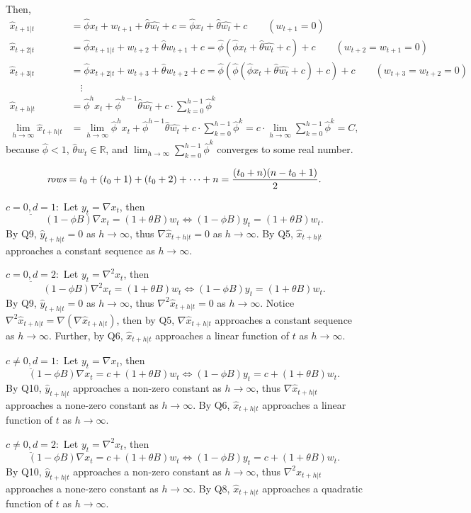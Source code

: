 \documentclass{article}
\begin{document}
Then, 
\begin{align*}
    \hat{x}_{t+1|t} & = \hat{\phi}x_t + w_{t+1} + \hat{\theta}\hat{w_t} + c = 
    \hat{\phi}x_t + \hat{\theta}\hat{w_t} + c \qquad (w_{t+1} = 0) \\
    \hat{x}_{t+2|t} & = \hat{\phi}x_{t+1|t} + w_{t+2} + \hat{\theta}w_{t+1} + c =
    \hat{\phi}\left(\hat{\phi}x_t + \hat{\theta}\hat{w_t}+c\right)+c \qquad (w_{t+2} =w_{t+1} = 0) \\
    \hat{x}_{t+3|t} & = \hat{\phi}x_{t+2|t} + w_{t+3} + \hat{\theta}w_{t+2}+c =
    \hat{\phi}\left(\hat{\phi}\left(\hat{\phi}x_t + \hat{\theta}\hat{w_t}+c\right)+c\right)+c \qquad (w_{t+3} =w_{t+2} = 0) \\
    &\quad \vdots \\
    \hat{x}_{t+h|t} & = \hat{\phi}^hx_t + \hat{\phi}^{h-1}\hat{\theta}\hat{w_t}+ c\cdot\sum_{k=0}^{h-1}\hat{\phi}^k \\
    \lim_{h\to\infty}\hat{x}_{t+h|t} & = \lim_{h\to\infty}\hat{\phi}^hx_t + \hat{\phi}^{h-1}\hat{\theta}\hat{w_t}+ c\cdot\sum_{k=0}^{h-1}\hat{\phi}^k =
    c\cdot\lim_{h\to\infty}\sum_{k=0}^{h-1}\hat{\phi}^k = C,
\end{align*}
because $\hat{\phi} < 1$, $\hat{\theta}w_t\in\mathbb{R}$, and 
$\lim_{h\to\infty}\sum_{k=0}^{h-1}\hat{\phi}^k$ converges to some real number.

$$\emph{rows} = t_0 + (t_0 + 1) + (t_0 + 2) + \cdots + n = \frac{(t_0 + n)(n-t_0+1)}{2}.$$

$\underline{c=0, d=1}:$
Let $y_t = \nabla x_t$, then 
$$(1-\phi B)\nabla x_t = (1+\theta B)w_t \Leftrightarrow (1-\phi B)y_t = (1+\theta B)w_t.$$
By Q9, $\hat{y}_{t+h|t}= 0$ as $h\to\infty$, thus $\nabla \hat{x}_{t+h|t}=0$ as $h\to\infty$.
By Q5, $\hat{x}_{t+h|t}$ approaches a constant sequence as $h\to\infty$.

$\underline{c=0, d=2}:$
Let $y_t = \nabla^2 x_t$, then 
$$(1-\phi B)\nabla^2 x_t = (1+\theta B)w_t \Leftrightarrow (1-\phi B)y_t = (1+\theta B)w_t.$$
By Q9, $\hat{y}_{t+h|t}= 0$ as $h\to\infty$, thus $\nabla^2 \hat{x}_{t+h|t}=0$ as $h\to\infty$.
Notice $\nabla^2\hat{x}_{t+h|t} = \nabla(\nabla\hat{x}_{t+h|t})$, then by Q5, 
$\nabla\hat{x}_{t+h|t}$ approaches a constant sequence as $h\to\infty$. Further, by Q6,
$\hat{x}_{t+h|t}$ approaches a linear function of $t$ as $h\to\infty$.

$\underline{c\neq0, d=1}:$
Let $y_t = \nabla x_t$, then 
$$(1-\phi B)\nabla x_t = c + (1+\theta B)w_t \Leftrightarrow (1-\phi B)y_t = c + (1+\theta B)w_t.$$
By Q10, $\hat{y}_{t+h|t}$ approaches a non-zero constant as $h\to\infty$, thus $\nabla \hat{x}_{t+h|t}$ 
approaches a none-zero constant as $h\to\infty$.
By Q6, $\hat{x}_{t+h|t}$ approaches a linear function of $t$ as $h\to\infty$.

$\underline{c\neq0, d=2}:$
Let $y_t = \nabla^2 x_t$, then 
$$(1-\phi B)\nabla x_t = c + (1+\theta B)w_t \Leftrightarrow (1-\phi B)y_t = c + (1+\theta B)w_t.$$
By Q10, $\hat{y}_{t+h|t}$ approaches a non-zero constant as $h\to\infty$, thus $\nabla^2 \hat{x}_{t+h|t}$ 
approaches a none-zero constant as $h\to\infty$.
By Q8, $\hat{x}_{t+h|t}$ approaches a quadratic function of $t$ as $h\to\infty$.
\end{document}
